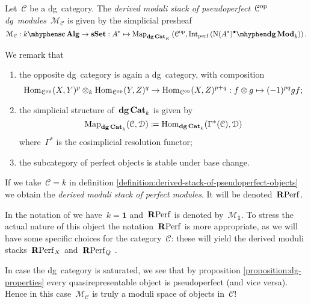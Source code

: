 \begin{refsection}
\begin{definition}
  \label{definition:derived-stack-of-pseudoperfect-objects}
  Let~$\mathcal{C}$ be a dg~category. The \emph{derived moduli stack of pseudoperfect~$\mathcal{C}^{\mathrm{op}}$\dash dg~modules}~$\mathcal{M}_{\mathcal{C}}$ is given by the simplicial presheaf
  \begin{equation}
    \mathcal{M}_{\mathcal{C}}:\scAlg{k}\to\sSet:A^*\mapsto\Map_{\dgCat_K}\left( \mathcal{C}^\opp,\Int_\perf\left( \dgMod{\nerve(A^*)^\bullet}_k \right) \right).
  \end{equation}
\end{definition}

We remark that
\begin{enumerate}
  \item the opposite dg~category is again a dg~category, with composition
    \begin{equation}
      \mathrm{Hom}_{\mathcal{C}^{\mathrm{op}}}(X,Y)^p\otimes_k\mathrm{Hom}_{\mathcal{C}^{\mathrm{op}}}(Y,Z)^q\to\mathrm{Hom}_{\mathcal{C}^{\mathrm{op}}}(X,Z)^{p+q}:f\otimes g\mapsto(-1)^{pq}gf;
    \end{equation}
  \item the simplicial structure of~$\mathbf{dg\,Cat}_k$ is given by
    \begin{equation}
      \operatorname{\mathrm{Map}}_{\mathbf{dg\,Cat}_k}(\mathcal{C},\mathcal{D})\coloneqq\mathrm{Hom}_{\mathbf{dg\,Cat}_k}(\Gamma^*(\mathcal{C}),\mathcal{D})
    \end{equation}
    where~$\Gamma^*$ is the cosimplicial resolution functor;
  \item the subcategory of perfect objects is stable under base change.
\end{enumerate}

\begin{definition}
  If we take~$\mathcal{C}=k$ in definition \ref{definition:derived-stack-of-pseudoperfect-objects} we obtain the \emph{derived moduli stack of perfect modules}. It will be denoted~$\mathbf{R}\mathrm{Perf}$.
\end{definition}

In the notation of \cite{toen-vaquie} we have~$k=\mathbf{1}$ and~$\mathbf{R}\mathrm{Perf}$ is denoted by~$\mathcal{M}_{\mathbf{1}}$. To stress the actual nature of this object the notation~$\mathbf{R}\mathrm{Perf}$ is more appropriate, as we will have some specific choices for the category~$\mathcal{C}$: these will yield the derived moduli stacks~$\mathbf{R}\mathrm{Perf}_X$ and~$\mathbf{R}\mathrm{Perf}_Q$ \cite[section 3.5]{toen-vaquie}.
\begin{remark}
  \label{remark:saturated}
  In case the dg~category is saturated, we see that by proposition \ref{proposition:dg-properties} every quasirepresentable object is pseudoperfect (and vice versa). Hence in this case~$\mathcal{M}_{\mathcal{C}}$ is truly a moduli space of objects in~$\mathcal{C}$!
\end{remark}


\end{refsection}
